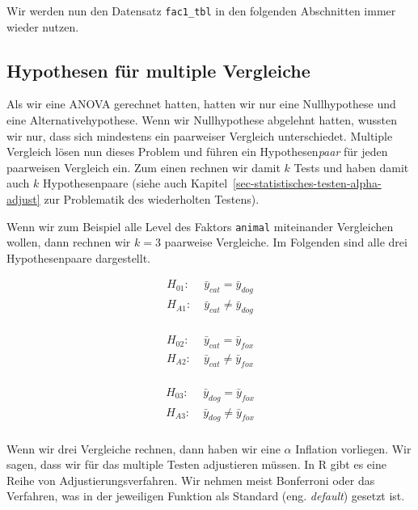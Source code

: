 \documentclass[
  letterpaper,
]{scrbook}
\begin{document}
Wir werden nun den Datensatz \texttt{fac1\_tbl} in den folgenden
Abschnitten immer wieder nutzen.

\hypertarget{hypothesen-fuxfcr-multiple-vergleiche}{%
\subsection{Hypothesen für multiple
Vergleiche}\label{hypothesen-fuxfcr-multiple-vergleiche}}

Als wir eine ANOVA gerechnet hatten, hatten wir nur eine Nullhypothese
und eine Alternativehypothese. Wenn wir Nullhypothese abgelehnt hatten,
wussten wir nur, dass sich mindestens ein paarweiser Vergleich
unterschiedet. Multiple Vergleich lösen nun dieses Problem und führen
ein Hypothesen\emph{paar} für jeden paarweisen Vergleich ein. Zum einen
rechnen wir damit \(k\) Tests und haben damit auch \(k\) Hypothesenpaare
(siehe auch Kapitel~\ref{sec-statistisches-testen-alpha-adjust} zur
Problematik des wiederholten Testens).

Wenn wir zum Beispiel alle Level des Faktors \texttt{animal} miteinander
Vergleichen wollen, dann rechnen wir \(k=3\) paarweise Vergleiche. Im
Folgenden sind alle drei Hypothesenpaare dargestellt.

\[
\begin{align*}
H_{01}: &\; \bar{y}_{cat} = \bar{y}_{dog}\\
H_{A1}: &\; \bar{y}_{cat} \ne \bar{y}_{dog}\\
\end{align*}
\]

\[
\begin{align*}
H_{02}: &\; \bar{y}_{cat} = \bar{y}_{fox}\\
H_{A2}: &\; \bar{y}_{cat} \ne \bar{y}_{fox}\\
\end{align*}
\]

\[
\begin{align*}
H_{03}: &\; \bar{y}_{dog} = \bar{y}_{fox}\\
H_{A3}: &\; \bar{y}_{dog} \ne \bar{y}_{fox}\\
\end{align*}
\]

Wenn wir drei Vergleiche rechnen, dann haben wir eine \(\alpha\)
Inflation vorliegen. Wir sagen, dass wir für das multiple Testen
adjustieren müssen. In R gibt es eine Reihe von Adjustierungsverfahren.
Wir nehmen meist Bonferroni oder das Verfahren, was in der jeweiligen
Funktion als Standard (eng. \emph{default}) gesetzt ist.
\end{document}
